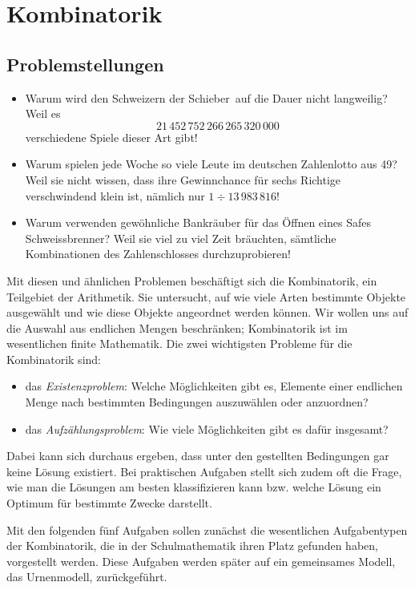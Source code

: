 \documentclass[%
11pt,%
twoside,%
titlepage,%
german,%
headsepline%
]{scrartcl}
\newcommand{\definition}[1]{\colorbox{emerald}{#1}}
\begin{document}
\clearpage

\appendix

\section{Kombinatorik}
\subsection{Problemstellungen}
\begin{itemize}
\item Warum wird den Schweizern der \glqq Schieber\grqq\ auf die Dauer nicht langweilig? Weil es
$$21\,452\,752\,266\,265\,320\,000$$
verschiedene Spiele dieser Art gibt!
\item Warum spielen jede Woche so viele Leute im deutschen Zahlenlotto  aus 49\grqq?
Weil sie nicht wissen, dass ihre Gewinnchance für sechs Richtige verschwindend klein ist, nämlich nur $1\div13\,983\,816$!
\item Warum verwenden gewöhnliche Bankräuber für das Öffnen eines Safes Schweissbrenner?
Weil sie viel zu viel Zeit bräuchten, sämtliche Kombinationen des Zahlenschlosses durchzuprobieren!
\end{itemize}

Mit diesen und ähnlichen Problemen beschäftigt sich die \definition{Kombinatorik}, ein Teilgebiet der Arithmetik. Sie untersucht, auf wie viele Arten bestimmte Objekte ausgewählt und wie diese Objekte angeordnet werden können. Wir wollen uns auf die Auswahl aus endlichen Mengen beschränken; Kombinatorik ist im wesentlichen finite Mathematik. Die zwei wichtigsten Probleme für die Kombinatorik sind:
\begin{itemize}
\item das \emph{Existenzproblem}: Welche Möglichkeiten gibt es, Elemente einer endlichen Menge nach bestimmten Bedingungen auszuwählen oder anzuordnen?
\item das \emph{Aufzählungsproblem}: Wie viele Möglichkeiten gibt es dafür insgesamt?
\end{itemize}

Dabei kann sich durchaus ergeben, dass unter den gestellten Bedingungen gar keine Lösung existiert. Bei praktischen Aufgaben stellt sich zudem oft die Frage, wie man die Lösungen am besten klassifizieren kann bzw. welche Lösung ein Optimum für bestimmte Zwecke darstellt.

Mit den folgenden fünf Aufgaben sollen zunächst die wesentlichen Aufgabentypen der Kombinatorik, die in der Schulmathematik ihren Platz gefunden haben, vorgestellt werden. Diese Aufgaben werden später auf ein gemeinsames Modell, das Urnenmodell, zurückgeführt.
\end{document}
